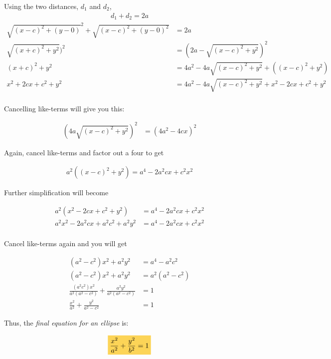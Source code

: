 \documentclass{article}
\newcommand{\highlight}[1]{%
  \colorbox{yellowOrange}{$\displaystyle#1$}}
\begin{document}
Using the two distances, \textcolor{blueGreen1}{$d_1$} and \textcolor{blueGreen2}{$d_2$},
\begin{align*}
  d_1 + d_2 = 2a
\end{align*}
\begin{align*}
  \sqrt{(x - c)^2 + (y - 0)}^2 + \sqrt{(x - c)^2 + (y - 0)^2} &= 2a\\
  \sqrt{(x + c)^2 + y^2})^2 &= (2a - \sqrt{(x - c)^2 + y^2})^2\\
  (x + c)^2 + y^2 &= 4a^2 - 4a\sqrt{(x - c)^2 + y^2} + ((x - c)^2 + y^2)\\
  x^2 + 2cx + c^2 + y^2 &= 4a^2 - 4a\sqrt{(x - c)^2 + y^2} + x^2 - 2cx + c^2 + y^2\\
\end{align*}
\begin{flushleft}
  Cancelling like-terms will give you this:
\end{flushleft}
\begin{align*}
  (4a\sqrt{(x - c)^2 + y^2})^2 &= (4a^2 - 4cx)^2
\end{align*}
\begin{flushleft}
\newpage
  Again, cancel like-terms and factor out a four to get
\end{flushleft}
\begin{align*}
  a^2((x - c)^2 + y^2) = a^4 - 2a^2cx + c^2x^2
\end{align*}
\begin{flushleft}
  Further simplification will become
\end{flushleft}
\begin{align*}
  a^2(x^2 - 2cx + c^2 + y^2) &= a^4 - 2a^2cx + c^2x^2\\
  a^2x^2 - 2a^2cx + a^2c^2 + a^2y^2 &= a^4 - 2a^2cx + c^2x^2\\
\end{align*}
\begin{flushleft}
  Cancel like-terms again and you will get
\end{flushleft}
\begin{align*}
  (a^2 - c^2)x^2 + a^2y^2 &= a^4 - a^2c^2\\
  (a^2 - c^2)x^2 + a^2y^2 &= a^2(a^2 - c^2)\\
  \frac{(a^2c^2)x^2}{a^2(a^2 - c^2)} + \frac{a^2y^2}{a^2(a^2 - c^2)} &= 1\\
  \frac{x^2}{a^2} + \frac{y^2}{a^2 - c^2} &= 1
\end{align*}
\begin{flushleft}

  Thus, the \emph{final equation for an ellipse} is:

\end{flushleft}
\begin{align*}
  \highlight{\frac{x^2}{a^2} + \frac{y^2}{b^2} = 1}
\end{align*}
\end{document}
